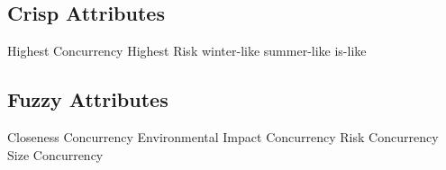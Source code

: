 \subsection{Crisp Attributes}
Highest Concurrency
Highest Risk %
winter-like
summer-like
is-like

\subsection{Fuzzy Attributes}
Closeness Concurrency
Environmental Impact Concurrency
Risk Concurrency %
Size Concurrency %
